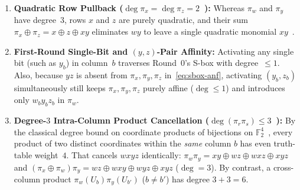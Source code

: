 \documentclass[11pt,a4paper]{article}
\theoremstyle{definition}
\theoremstyle{remark}
\newcommand{\Ftwo}{\mathbb{F}_2}
\begin{document}
\begin{enumerate}[label=(I.\arabic*),leftmargin=2.2em,nosep]
    \item \textbf{Quadratic Row Pullback ($\deg \pi_x = \deg \pi_z = 2$~\cite{BRRT25}):} Whereas $\pi_w$ and $\pi_y$ have degree~$3$, rows $x$ and $z$ are purely quadratic, and their sum $\pi_x \oplus \pi_z = x \oplus z \oplus xy$ eliminates $wy$ to leave a single quadratic monomial $xy$~\cite{BRRT25}.
    \item \textbf{First-Round Single-Bit and $(y,z)$-Pair Affinity:} Activating any single bit (such as $y_b$) in column~$b$ traverses Round~$0$'s S-box with degree~$\le 1$. Also, because $yz$ is absent from $\pi_x, \pi_y, \pi_z$ in~\eqref{eq:sbox-anf}, activating $(y_b, z_b)$ simultaneously still keeps $\pi_x, \pi_y, \pi_z$ purely affine ($\deg \le 1$) and introduces only $w_b y_b z_b$ in $\pi_w$.
    \item \textbf{Degree-$3$ Intra-Column Product Cancellation ($\deg(\pi_r \pi_s) \le 3$~\cite{BC11}):} By the classical degree bound on coordinate products of bijections on $\Ftwo^4$~\cite{BC11}, every product of two distinct coordinates within the \emph{same} column $b$ has even truth-table weight~$4$. That cancels $wxyz$ identically: $\pi_w \pi_y = xy \oplus wz \oplus wxz \oplus xyz$ and $(\pi_x \oplus \pi_w)\pi_y = wz \oplus wxy \oplus wyz \oplus xyz$ ($\deg = 3$). By contrast, a cross-column product $\pi_w(U_b)\pi_y(U_{b'})$ ($b \neq b'$) has degree $3 + 3 = 6$.
\end{enumerate}
\end{document}
